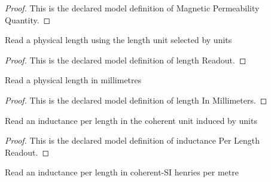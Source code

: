 \begin{proof}
  This is the declared model definition of Magnetic Permeability Quantity.
\end{proof}
\begin{definition}
  \label{def:physics:phyx-mini-0885:phyxminiproblems-problemphyxmini0885-lengthreadout}
  Read a physical length using the length unit selected by units
\end{definition}
\begin{proof}
  This is the declared model definition of length Readout.
\end{proof}
\begin{definition}
  \label{def:physics:phyx-mini-0885:phyxminiproblems-problemphyxmini0885-lengthinmillimeters}
  Read a physical length in millimetres
\end{definition}
\begin{proof}
  This is the declared model definition of length In Millimeters.
\end{proof}
\begin{definition}
  \label{def:physics:phyx-mini-0885:phyxminiproblems-problemphyxmini0885-inductanceperlengthreadout}
  Read an inductance per length in the coherent unit induced by units
\end{definition}
\begin{proof}
  This is the declared model definition of inductance Per Length Readout.
\end{proof}
\begin{definition}
  \label{def:physics:phyx-mini-0885:phyxminiproblems-problemphyxmini0885-inductanceperlengthinhenriespermeter}
  Read an inductance per length in coherent-SI henries per metre
\end{definition}

